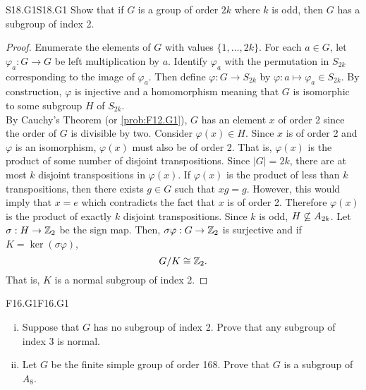 \documentclass[../AlgebraQualSolutions.tex]{subfiles}
\begin{document}
\begin{prob}{S18.G1}{S18.G1}
    Show that if $G$ is a group of order $2k$ where $k$ is odd, then $G$ has a subgroup of index 2.
\end{prob}

\begin{proof}
    Enumerate the elements of $G$ with values $\{1,\ldots, 2k\}$. For each $a \in G$, let $\varphi_a: G \to G$ be left multiplication by $a$. Identify $\varphi_a$ with the permutation in $S_{2k}$ corresponding to the image of $\varphi_a$. Then define $\varphi: G \to S_{2k}$ by $\varphi: a \mapsto \varphi_{a} \in S_{2k}$. By construction, $\varphi$ is injective and a homomorphism meaning that $G$ is isomorphic to some subgroup $H$ of $S_{2k}$.\\

    By Cauchy's Theorem (or \ref{prob:F12.G1}), $G$ has an element $x$ of order 2 since the order of $G$ is divisible by two. Consider $\varphi(x) \in H$. Since $x$ is of order 2 and $\varphi$ is an isomorphism, $\varphi(x)$ must also be of order 2. That is, $\varphi(x)$ is the product of some number of disjoint transpositions. Since $|G| = 2k$, there are at most $k$ disjoint transpositions in $\varphi(x)$. If $\varphi(x)$ is the product of less than $k$ transpositions, then there exists $g \in G$ such that $xg = g$. However, this would imply that $x = e$ which contradicts the fact that $x$ is of order 2. Therefore $\varphi(x)$ is the product of exactly $k$ disjoint transpositions. Since $k$ is odd, $H \not\subseteq A_{2k}$. Let $\sigma: H \to \mathbb{Z}_2$ be the sign map. Then, $\sigma\varphi: G \to \mathbb{Z}_2$ is surjective and if $K = \ker(\sigma\varphi)$,
        \[G/K \cong \mathbb{Z}_2.\]
    That is, $K$ is a normal subgroup of index 2.
\end{proof}

\begin{prob}{F16.G1}{F16.G1}
    \begin{enumerate}[(i)]
        \item Suppose that $G$ has no subgroup of index 2. Prove that any subgroup of index 3 is normal.
        \item Let $G$ be the finite simple group of order 168. Prove that $G$ is a subgroup of $A_8$.
    \end{enumerate}
\end{prob}
\end{document}
